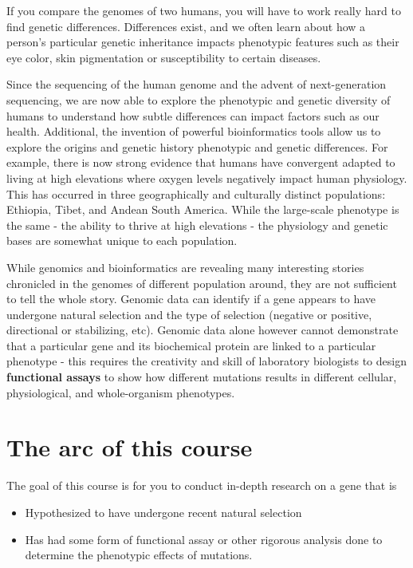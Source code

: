 \documentclass[
]{book}
\providecommand{\tightlist}{%
  \setlength{\itemsep}{0pt}\setlength{\parskip}{0pt}}
\begin{document}
If you compare the genomes of two humans, you will have to work really hard to find genetic differences. Differences exist, and we often learn about how a person's particular genetic inheritance impacts phenotypic features such as their eye color, skin pigmentation or susceptibility to certain diseases.

Since the sequencing of the human genome and the advent of next-generation sequencing, we are now able to explore the phenotypic and genetic diversity of humans to understand how subtle differences can impact factors such as our health. Additional, the invention of powerful bioinformatics tools allow us to explore the origins and genetic history phenotypic and genetic differences. For example, there is now strong evidence that humans have convergent adapted to living at high elevations where oxygen levels negatively impact human physiology. This has occurred in three geographically and culturally distinct populations: Ethiopia, Tibet, and Andean South America. While the large-scale phenotype is the same - the ability to thrive at high elevations - the physiology and genetic bases are somewhat unique to each population.

While genomics and bioinformatics are revealing many interesting stories chronicled in the genomes of different population around, they are not sufficient to tell the whole story. Genomic data can identify if a gene appears to have undergone natural selection and the type of selection (negative or positive, directional or stabilizing, etc). Genomic data alone however cannot demonstrate that a particular gene and its biochemical protein are linked to a particular phenotype - this requires the creativity and skill of laboratory biologists to design \textbf{functional assays} to show how different mutations results in different cellular, physiological, and whole-organism phenotypes.

\hypertarget{the-arc-of-this-course}{%
\section{The arc of this course}\label{the-arc-of-this-course}}

The goal of this course is for you to conduct in-depth research on a gene that is

\begin{itemize}
\tightlist
\item
  Hypothesized to have undergone recent natural selection
\item
  Has had some form of functional assay or other rigorous analysis done to determine the phenotypic effects of mutations.
\end{itemize}
\end{document}
